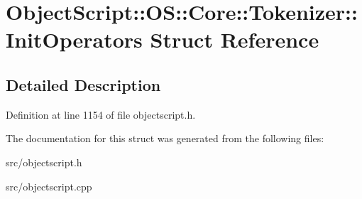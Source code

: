 \hypertarget{struct_object_script_1_1_o_s_1_1_core_1_1_tokenizer_1_1_init_operators}{}\section{Object\+Script\+:\+:OS\+:\+:Core\+:\+:Tokenizer\+:\+:Init\+Operators Struct Reference}
\label{struct_object_script_1_1_o_s_1_1_core_1_1_tokenizer_1_1_init_operators}


\subsection{Detailed Description}


Definition at line 1154 of file objectscript.\+h.



The documentation for this struct was generated from the following files\+:\begin{DoxyCompactItemize}
\item 
src/objectscript.\+h\item 
src/objectscript.\+cpp\end{DoxyCompactItemize}
